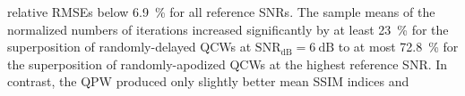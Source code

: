 relative \acp{RMSE} below
\SI{6.9}{\percent} for
all reference \acp{SNR}.
%
%
%
%
%
The sample means of
the normalized numbers of
iterations increased significantly by
at least \SI{23}{\percent} for
the superposition of
randomly-delayed \acp{QCW} at
$\text{SNR}_{\text{dB}} = \SI{6}{\deci\bel}$ to
at most \SI{72.8}{\percent} for
the superposition of
randomly-apodized \acp{QCW} at
the highest reference \ac{SNR}.
In contrast,
the \ac{QPW} produced
only slightly better mean \ac{SSIM} indices and
